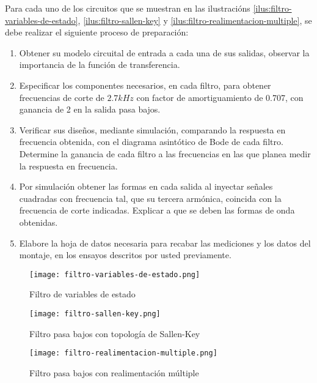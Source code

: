 Para cada uno de los circuitos que se muestran en las ilustracións \ref{ilus:filtro-variables-de-estado}, \ref{ilus:filtro-sallen-key} y \ref{ilus:filtro-realimentacion-multiple}, se debe realizar el siguiente proceso de preparación:

\begin{enumerate}
    \item Obtener su modelo circuital de entrada a cada una de sus salidas, observar la importancia de la función de transferencia.
    \item Especificar los componentes necesarios, en cada filtro, para obtener frecuencias de corte de $2.7 kHz$ con factor de amortiguamiento de 0.707, con ganancia de 2 en la salida pasa bajos.
    \item Verificar sus diseños, mediante simulación, comparando la respuesta en frecuencia obtenida, con el diagrama asintótico de Bode de cada filtro. Determine la ganancia de cada filtro a las frecuencias en las que planea medir la respuesta en frecuencia.
    \item Por simulación obtener las formas en cada salida al inyectar señales cuadradas con frecuencia tal, que su tercera armónica, coincida con la frecuencia de corte indicadas. Explicar a que se deben las formas de onda obtenidas.
    \item Elabore la hoja de datos necesaria para recabar las mediciones y los datos del montaje, en los ensayos descritos por usted previamente.
\end{enumerate}

\begin{figure}[ht]
    \centering
    \texttt{[image: filtro-variables-de-estado.png]}
    \caption{Filtro de variables de estado}
    \label{fig:filtro-variables-de-estado}
\end{figure}

\begin{figure}[ht]
    \centering
    \texttt{[image: filtro-sallen-key.png]}
    \caption{Filtro pasa bajos con topología de Sallen-Key}
    \label{fig:filtro-sallen-key}
\end{figure}

\begin{figure}[ht]
    \centering
    \texttt{[image: filtro-realimentacion-multiple.png]}
    \caption{Filtro pasa bajos con realimentación múltiple}
    \label{fig:filtro-realimentacion-multiple}
\end{figure}

